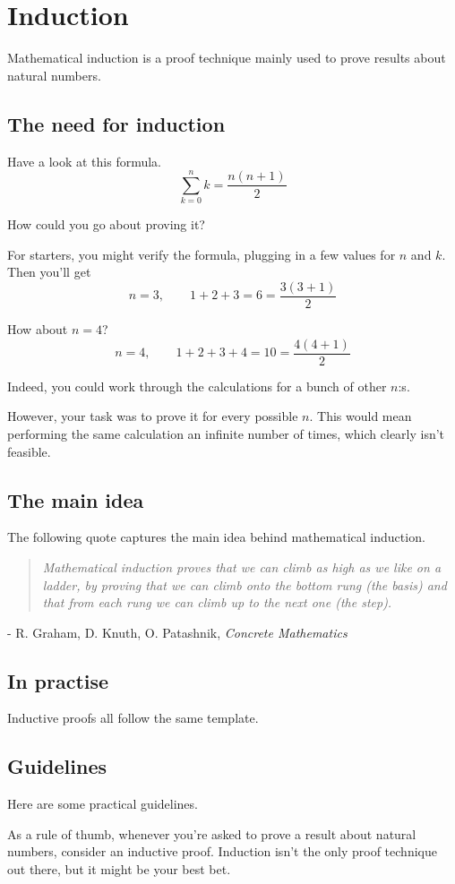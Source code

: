 \documentclass{scrreprt}
\newcommand{\somequote}[3]{\begin{quotation} \textit{#1} \end{quotation} \begin{flushright} - #2, \textit{#3}\end{flushright} }
\begin{document}
\section{Induction}

Mathematical induction is a proof technique mainly used to prove results about natural numbers.

\subsection*{The need for induction}

Have a look at this formula.
$$\sum_{k = 0}^n k = \frac{n(n + 1)}{2}$$

How could you go about proving it?

For starters, you might verify the formula, plugging in a few values for $n$ and $k$. Then you'll get
$$n = 3, \qquad 1 + 2 + 3 = 6 = \frac{3(3 + 1)}{2}$$

How about $n = 4$?
$$n = 4, \qquad 1 + 2 + 3 + 4 = 10 = \frac{4(4 + 1)}{2}$$

Indeed, you could work through the calculations for a bunch of other $n$:s.

However, your task was to prove it for every possible $n$. This would mean performing the same calculation an infinite number of times, which clearly isn't feasible.

\subsection*{The main idea}

The following quote captures the main idea behind mathematical induction.

\somequote{Mathematical induction proves that we can climb as high as we like on a ladder, by proving that we can climb onto the bottom rung (the basis) and that from each rung we can climb up to the next one (the step).}{R. Graham, D. Knuth, O. Patashnik}{Concrete Mathematics}

\subsection*{In practise}

Inductive proofs all follow the same template.

\subsection*{Guidelines}
Here are some practical guidelines.

As a rule of thumb, whenever you're asked to prove a result about natural numbers, consider an inductive proof. Induction isn't the only proof technique out there, but it might be your best bet.
\end{document}
